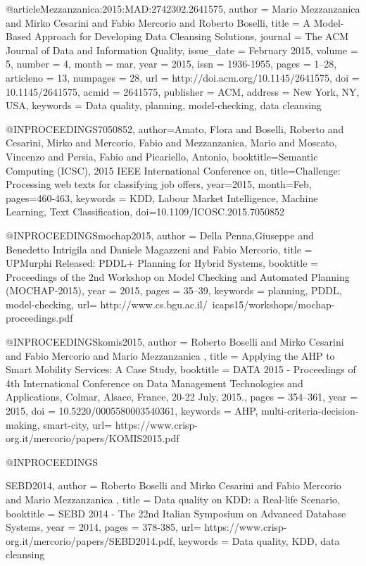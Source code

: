 {{@article{Mezzanzanica:2015:MAD:2742302.2641575,
 author = {Mario Mezzanzanica and Mirko Cesarini and Fabio Mercorio and Roberto Boselli},
 title = {A Model-Based Approach for Developing Data Cleansing Solutions},
 journal = {The {ACM} Journal of Data and Information Quality},
 issue_date = {February 2015},
 volume = {5},
 number = {4},
 month = mar,
 year = {2015},
 issn = {1936-1955},
 pages = {1--28},
 articleno = {13},
 numpages = {28},
 url = {http://doi.acm.org/10.1145/2641575},
 doi = {10.1145/2641575},
 acmid = {2641575},
 publisher = {ACM},
 address = {New York, NY, USA},
 keywords = {Data quality, planning, model-checking, data cleansing}
}

@INPROCEEDINGS{7050852, 
author={Amato, Flora and Boselli, Roberto and Cesarini, Mirko and Mercorio, Fabio and Mezzanzanica, Mario and Moscato, Vincenzo and Persia, Fabio and Picariello, Antonio}, 
booktitle={Semantic Computing (ICSC), 2015 IEEE International Conference on}, 
title={Challenge: Processing web texts for classifying job offers}, 
year={2015}, 
month={Feb}, 
pages={460-463}, 
keywords = {KDD, Labour Market Intelligence, Machine Learning, Text Classification},
doi={10.1109/ICOSC.2015.7050852}
}

@INPROCEEDINGS{mochap2015,
  author = { {Della Penna},Giuseppe and Benedetto Intrigila and Daniele Magazzeni and Fabio Mercorio},
  title = { {UPM}urphi Released: {PDDL}+ Planning for Hybrid Systems},
  booktitle = {Proceedings of the 2nd Workshop on Model Checking and Automated Planning (MOCHAP-2015)},
  year = {2015},
  pages = {35--39},
  keywords = {planning, PDDL, model-checking},
  url= {http://www.cs.bgu.ac.il/~icaps15/workshops/mochap-proceedings.pdf}
}

@INPROCEEDINGS{komis2015,
  author = {Roberto Boselli and Mirko Cesarini and Fabio Mercorio and Mario Mezzanzanica },
  title = {Applying the AHP to Smart Mobility Services: A Case Study},
  booktitle = { {DATA} 2015 - Proceedings of 4th International Conference on Data
               Management Technologies and Applications, Colmar, Alsace, France,
               20-22 July, 2015.},
  pages     = {354--361},
  year      = {2015},
  doi       = {10.5220/0005580003540361},
  keywords = {AHP, multi-criteria-decision-making, smart-city},
  url= {https://www.crisp-org.it/mercorio/papers/KOMIS2015.pdf}
}


@INPROCEEDINGS{SEBD2014,
  author = {Roberto Boselli and Mirko Cesarini and Fabio Mercorio and Mario Mezzanzanica },
  title = {Data quality on KDD: a Real-life Scenario},
  booktitle = {SEBD 2014 -  The 22nd Italian Symposium on Advanced Database Systems},
  year = {2014},
  pages = {378-385},
  url= {https://www.crisp-org.it/mercorio/papers/SEBD2014.pdf},
   keywords = {Data quality, KDD, data cleansing}

}}}

